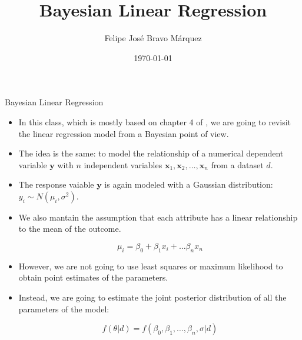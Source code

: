 \documentclass[handout]{beamer}
\title{Bayesian Linear Regression}
\author[Felipe Bravo Márquez]{\footnotesize
 \textcolor[rgb]{0.00,0.00,1.00}{Felipe José Bravo Márquez}}
\date{ \today }
\begin{document}
\begin{frame}
\titlepage


\end{frame}




\begin{frame}{Bayesian Linear Regression}
\scriptsize{
\begin{itemize}
\item In this class, which  is mostly based on chapter 4 of \cite{mcelreath2020statistical}, we are going to revisit the linear regression model from a Bayesian point of view.


\item The idea is the same: to model the relationship of a numerical dependent variable $\mathbf{y}$ with $n$ independent variables  $\mathbf{x}_1, \mathbf{x}_2, \dots, \mathbf{x}_n$ from a dataset $d$.

\item The response vaiable $\mathbf{y}$ is again modeled with a Gaussian distribution: $y_i \sim N(\mu_i,\sigma^2)$.


\item We also mantain the assumption that each attribute has a linear relationship to the mean of the outcome.

\begin{displaymath}
\mu_i = \beta_0 + \beta_1 x_i + \dots \beta_n x_n
\end{displaymath}

\item However, we are not going to use least squares or maximum likelihood to obtain point estimates of the parameters.

\item Instead, we are going to estimate the joint posterior distribution of all the parameters of the model:

\begin{displaymath}
f(\theta|d)= f(\beta_0,\beta_1,\dots,\beta_n,\sigma|d)
\end{displaymath}







 
\end{itemize}



} 

\end{frame}
\end{document}
